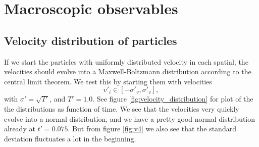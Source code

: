 
\section*{Macroscopic observables}
\subsection*{Velocity distribution of particles}
If we start the particles with uniformly distributed velocity in each spatial, the velocities should evolve into a Maxwell-Boltzmann distribution according to the central limit theorem. We test this by starting them with velocities 
\[
    v'_i\in[-\sigma'_v, \sigma'_v],
\]
with $\sigma' = \sqrt{T'}$, and $T' = 1.0$. See figure \ref{fig:velocity_distribution} for plot of the the distributions as function of time. We see that the velocities very quickly evolve into a normal distribution, and we have a pretty good normal distribution already at $t' = 0.075$. But from figure \ref{fig:v4} we also see that the standard deviation fluctuates a lot in the beginning.

